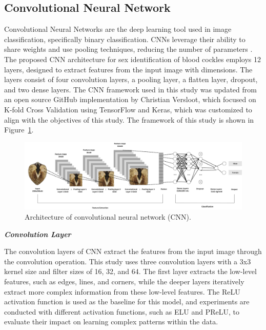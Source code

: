 \subsection{Convolutional Neural Network}

Convolutional Neural Networks are the deep learning tool used in image classification, specifically binary classification. CNNs leverage their ability to share weights and use pooling techniques, reducing the number of parameters \cite{cui2020}. The proposed CNN architecture for sex identification of blood cockles employs 12 layers, designed to extract features from the input image with dimensions. The layers consist of four convolution layers, a pooling layer, a flatten layer, dropout, and two dense layers. The CNN framework used in this study was updated from an open source GitHub implementation by Christian Versloot, which focused on K-fold Cross Validation using TensorFlow and Keras, which was customized to align with the objectives of this study. The framework of this study is shown in Figure~\ref{fig:cnn_architecture}.


\begin{figure}[h]
	\centering
	\includegraphics[width=\textwidth]{figures/cnn_architecture.png}
	\caption{Architecture of convolutional neural network (CNN).}
	\label{fig:cnn_architecture}
\end{figure}

\textbf{\textit{Convolution Layer}}

The convolution layers of CNN extract the features from the input image through the convolution operation. This study uses three convolution layers with a 3x3 kernel size and filter sizes of 16, 32, and 64. The first layer extracts the low-level features, such as edges, lines, and corners, while the deeper layers iteratively extract more complex information from these low-level features. The ReLU activation function is used as the baseline for this model, and experiments are conducted with different activation functions, such as ELU and PReLU, to evaluate their impact on learning complex patterns within the data.

